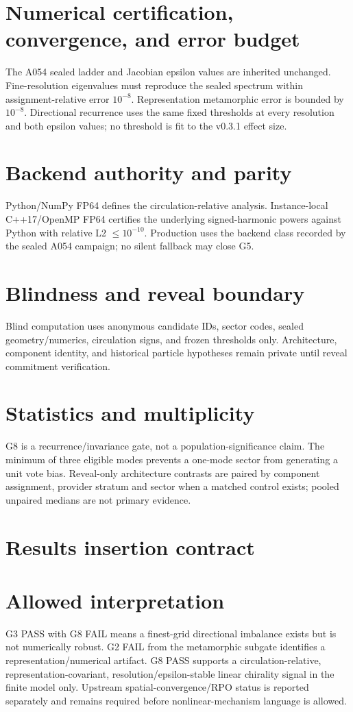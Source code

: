 \documentclass[11pt,a4paper]{article}
\begin{document}
\section{Numerical certification, convergence, and error budget}
The A054 sealed ladder and Jacobian epsilon values are inherited unchanged. Fine-resolution eigenvalues must reproduce the sealed spectrum within assignment-relative error $10^{-8}$. Representation metamorphic error is bounded by $10^{-8}$. Directional recurrence uses the same fixed thresholds at every resolution and both epsilon values; no threshold is fit to the v0.3.1 effect size.
\section{Backend authority and parity}
Python/NumPy FP64 defines the circulation-relative analysis. Instance-local C++17/OpenMP FP64 certifies the underlying signed-harmonic powers against Python with relative L2 $\le10^{-10}$. Production uses the backend class recorded by the sealed A054 campaign; no silent fallback may close G5.
\section{Blindness and reveal boundary}
Blind computation uses anonymous candidate IDs, sector codes, sealed geometry/numerics, circulation signs, and frozen thresholds only. Architecture, component identity, and historical particle hypotheses remain private until reveal commitment verification.
\section{Statistics and multiplicity}
G8 is a recurrence/invariance gate, not a population-significance claim. The minimum of three eligible modes prevents a one-mode sector from generating a unit vote bias. Reveal-only architecture contrasts are paired by component assignment, provider stratum and sector when a matched control exists; pooled unpaired medians are not primary evidence.
\section{Results insertion contract}
\section{Allowed interpretation}
G3 PASS with G8 FAIL means a finest-grid directional imbalance exists but is not numerically robust. G2 FAIL from the metamorphic subgate identifies a representation/numerical artifact. G8 PASS supports a circulation-relative, representation-covariant, resolution/epsilon-stable linear chirality signal in the finite model only. Upstream spatial-convergence/RPO status is reported separately and remains required before nonlinear-mechanism language is allowed.
\end{document}
